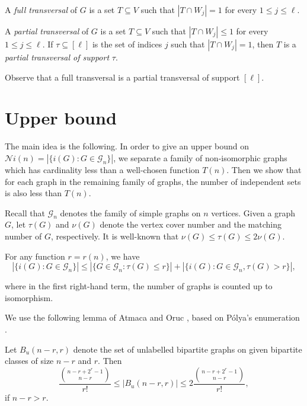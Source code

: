 \documentclass[10pt,a4paper]{article}
\numberwithin{equation}{section}
\newcommand{\cG}{\mathcal{G}}
\newcommand{\cNi}{\mathcal{N}i}
\begin{document}
\begin{definition}
A \textit{full transversal} of $G$ is a set $T\subseteq V$ such that $|T\cap W_j|=1$ for every $1\le j\le \ell$.
\end{definition}
\begin{definition}
A \textit{partial transversal} of $G$ is a set $T\subseteq V$ such that $|T\cap W_j|\le 1$ for every $1\le j\le \ell$. If $\tau\subseteq [\ell]$ is the set of indices $j$ such that $|T\cap W_j|=1$, then $T$ is a \textit{partial transversal of support} $\tau$.
\end{definition}
\noindent Observe that a full transversal is a partial transversal of support $[\ell]$.

\section{Upper bound}

The main idea is the following. In order to give an upper bound on $\cNi(n)=|\{i(G): G\in \cG_n\}|$, we separate a family of non-isomorphic graphs which has cardinality less than a well-chosen function $T(n)$. Then we show that for each graph in the remaining family of graphs, the number of independent sets is also less than $T(n)$.

Recall that $\cG_n$ denotes the family of simple graphs on $n$ vertices. Given a graph $G$, let $\tau(G)$ and $\nu(G)$ denote the vertex cover number and the matching number of $G$, respectively. It is well-known that $\nu(G)\le \tau(G)\le 2\nu(G)$.

\begin{observation}\label{cut} For any function $r=r(n)$, we have $$|\{i(G): G\in \cG_n\}|\le   |\{G\in \cG_n: \tau(G)\le r\}| + |\{i(G): G\in \cG_n, \tau(G)> r\}|,$$

where in the first right-hand term, the number of graphs is counted up to isomorphism.
\end{observation}

We use the following lemma of Atmaca and Oruc \cite{Oruc}, based on Pólya's enumeration \cite{Polya}.

\begin{lemma} Let $B_u(n-r,r)$ denote the set of unlabelled bipartite graphs on given bipartite classes of size $n-r$ and $r$. Then
   $$ \frac{{n-r+2^r-1\choose n-r}}{r!}\le |B_u(n-r,r)| \le 2\frac{{n-r+2^r-1\choose n-r}}{r!},$$ if $n-r > r.$
\end{lemma}
\end{document}

